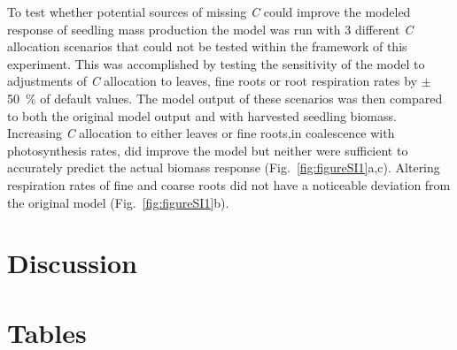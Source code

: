 \documentclass[a4paper]{article}\usepackage[]{graphicx}\usepackage[]{color}
\begin{document}
To test whether potential sources of missing \textit{C} could improve the modeled response of seedling mass production the model was run with 3 different \textit{C} allocation scenarios that could not be tested within the framework of this experiment. This was accomplished by testing the sensitivity of the model to adjustments of \textit{C} allocation to leaves, fine roots or root respiration rates by $\pm$50~\% of default values. The model output of these scenarios was then compared to both the original model output and with harvested seedling biomass.  Increasing \textit{C} allocation to either leaves or fine roots,in coalescence with photosynthesis rates, did improve the model but neither were sufficient to accurately predict the actual biomass response  (Fig.~\ref{fig:figureSI1}a,c). Altering respiration rates of fine and coarse roots did not have a noticeable deviation from the original model (Fig.~\ref{fig:figureSI1}b).

\section*{Discussion}


\section*{Tables}
\end{document}

